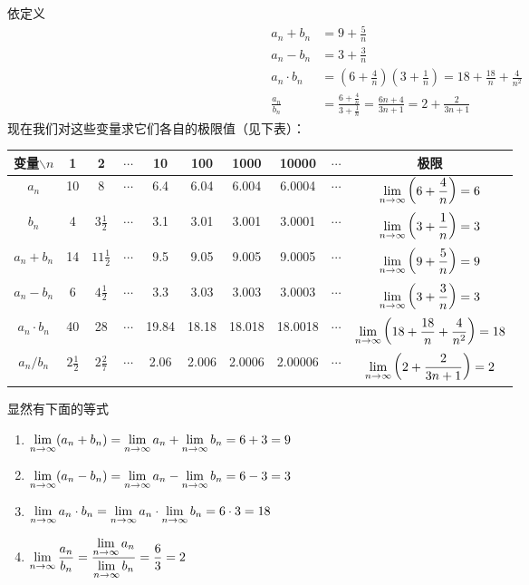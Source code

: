 \begin{solution}
    依定义
\[\begin{split}
    a_n+b_n&=9+\frac{5}{n}\\
a_n-b_n&=3+\frac{3}{n}\\
a_n\cdot b_n&=\left(6+\frac{4}{n}\right)\left(3+\frac{1}{n}\right)=18+\frac{18}{n}+\frac{4}{n^2}\\
\frac{a_n}{b_n}&=\frac{6+\frac{4}{n}}{3+\frac{1}{n}}=\frac{6n+4}{3n+1}=2+\frac{2}{3n+1}
\end{split}\]
现在我们对这些变量求它们各自的极限值（见下表）：
\begin{center}
\small
\renewcommand{\arraystretch}{1.8}
\setlength{\tabcolsep}{3pt}
\begin{tabular}{|c|c|c|c|c|c|c|c|c|c|}
\hline
变量$\backslash n$ & 1 & 2 & $\cdots$ & 10 & 100 & 1000 & 10000 & $\cdots$ & 极限\\
\hline
$a_n$ & 10 & 8 & $\cdots$ & 6.4 & 6.04 & 6.004 & 6.0004 & $\cdots$ & $\displaystyle\lim_{n\to\infty}\left(6+\dfrac{4}{n}\right)=6$\\
\hline
$b_n$ & 4 & $3\frac{1}{2}$ & $\cdots$ & 3.1 & 3.01 & 3.001 & 3.0001 & $\cdots$ & $\displaystyle\lim_{n\to\infty}\left(3+\dfrac{1}{n}\right)=3$\\
\hline
$a_n+b_n$ & 14 & $11\frac{1}{2}$ & $\cdots$ & 9.5 & 9.05 & 9.005 & 9.0005 & $\cdots$ & $\displaystyle\lim_{n\to\infty}\left(9+\dfrac{5}{n}\right)=9$\\
\hline
$a_n-b_n$ & 6 & $4\frac{1}{2}$ & $\cdots$ & 3.3 & 3.03 & 3.003 & 3.0003 & $\cdots$ & $\displaystyle\lim_{n\to\infty}\left(3+\dfrac{3}{n}\right)=3$\\
\hline
$a_n\cdot b_n$ & 40 & 28 & $\cdots$ & 19.84 & 18.18 & 18.018 & 18.0018 & $\cdots$ & $\displaystyle\lim_{n\to\infty}\left(18+\dfrac{18}{n}+\dfrac{4}{n^2}\right)=18$\\
\hline
$a_n/b_n$ & $2\frac{1}{2}$ & $2\frac{2}{7}$ & $\cdots$ & 2.06 & 2.006 & 2.0006 & 2.00006 & $\cdots$ & $\displaystyle\lim_{n\to\infty}\left(2+\dfrac{2}{3n+1}\right)=2$\\
\hline
\end{tabular}
\end{center}
显然有下面的等式
\begin{enumerate}
    \item $\displaystyle\lim_{n\to\infty}(a_n+b_n)=\displaystyle\lim_{n\to\infty}a_n+\displaystyle\lim_{n\to\infty}b_n=6+3=9$
    \item $\displaystyle\lim_{n\to\infty}(a_n-b_n)=\displaystyle\lim_{n\to\infty}a_n-\displaystyle\lim_{n\to\infty}b_n=6-3=3$
    \item $\displaystyle\lim_{n\to\infty}a_n\cdot b_n=\displaystyle\lim_{n\to\infty}a_n\cdot \displaystyle\lim_{n\to\infty}b_n=6\cdot 3=18$
    \item $\displaystyle\lim_{n\to\infty}\dfrac{a_n}{b_n}=\dfrac{\displaystyle\lim_{n\to\infty}a_n}{\displaystyle\lim_{n\to\infty}b_n}=\dfrac{6}{3}=2$
\end{enumerate}
\end{solution}

